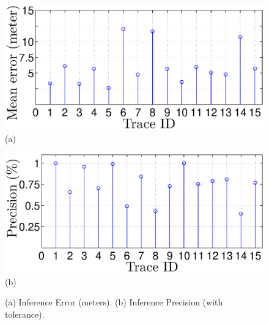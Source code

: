 \begin{figure}
\begin{minipage}[th]{0.48\columnwidth}
\centering
\includegraphics[scale=0.25]{error.eps}
{\small(a)}

\end{minipage}
\begin{minipage}[th]{0.48\columnwidth}
\centering
\includegraphics[scale=0.25]{precision.eps}
{\small(b)}
\end{minipage}
\caption{(a) Inference Error (meters). 
(b) Inference Precision (with tolerance).}
\label{fig:qande}
\end{figure}




